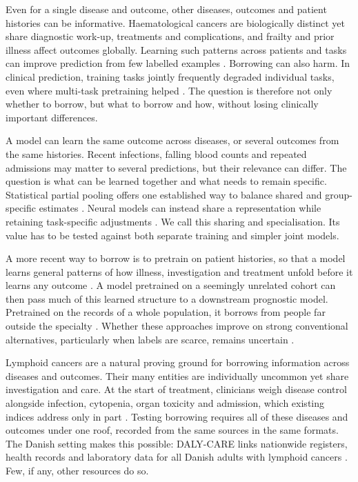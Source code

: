 Even for a single disease and outcome, other diseases, outcomes and patient
histories can be informative. Haematological cancers are biologically distinct
yet share diagnostic work-up, treatments and complications, and frailty and
prior illness affect outcomes globally. Learning such patterns across patients
and tasks can improve prediction from few labelled examples
\citep{Baxter2000,Maurer2016,zhang2019metapred}. Borrowing can also harm.
In clinical prediction, training tasks jointly frequently degraded individual
tasks, even where multi-task pretraining helped \citep{mcdermott2020mtl}. The question is therefore not only whether to borrow,
but what to borrow and how, without losing clinically important differences.

A model can learn the same outcome across diseases, or several outcomes from
the same histories. Recent infections, falling blood counts and repeated
admissions may matter to several predictions, but their relevance can differ.
The question is what can be learned together and what needs to remain specific.
Statistical partial pooling offers one established way to balance shared and
group-specific estimates \citep{EfronMorris1975}. Neural models can instead
share a representation while retaining task-specific adjustments
\citep{cui2024autodp,lee2022residualmoe}. We call this sharing and
specialisation. Its value has to be tested against both separate training and
simpler joint models.

A more recent way to borrow is to pretrain on patient histories, so that a model
learns general patterns of how illness, investigation and treatment unfold
before it learns any outcome \citep{li2020behrt,rasmy2021med,steinberg2023motor}.
A model pretrained on a seemingly unrelated cohort can then pass much of this
learned structure to a downstream prognostic model. Pretrained on the records of
a whole population, it borrows from people far outside the specialty
\citep{savcisens2024life2vec,shmatko2025delphi}. Whether these approaches improve
on strong conventional alternatives, particularly when labels are scarce,
remains uncertain \citep{wornow2023shaky,worth2026state}.

Lymphoid cancers are a natural proving ground for borrowing information across
diseases and outcomes. Their many entities are individually uncommon
\citep{alaggio2022who,sant2010haemacare} yet share investigation and care. At the
start of treatment, clinicians weigh disease control alongside infection,
cytopenia, organ toxicity and admission, which existing indices address only in
part \citep{DLG2025DLBCL,Tilly2022POLARIX}. Testing borrowing requires all of
these diseases and outcomes under one roof, recorded from the same sources in the
same formats. The Danish setting makes this possible: DALY-CARE links nationwide
registers, health records and laboratory data for all Danish adults with
lymphoid cancers \citep{brieghel2025dalycare}. Few, if any, other resources do
so.


